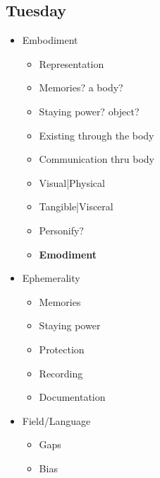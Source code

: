 \documentclass[12pt]{article}
\begin{document}
        \subsection{Tuesday}
            \bigskip
            \begin{itemize}
                \item Embodiment
                \begin{itemize}
                    \item Representation
                    \item Memories? a body?
                    \item Staying power? object?
                    \item Existing through the body
                    \item Communication thru body 
                    \item Visual|Physical
                    \item Tangible|Visceral
                    \item Personify?
                    \item \textbf{Emodiment}
                \end{itemize}
                \item Ephemerality
                \begin{itemize}
                    \item Memories
                    \item Staying power
                    \item Protection
                    \item Recording
                    \item Documentation
                \end{itemize}
                \item Field/Language
                \begin{itemize}
                    \item Gaps
                    \item Bias 

\end{itemize}
\end{itemize}
\end{document}
